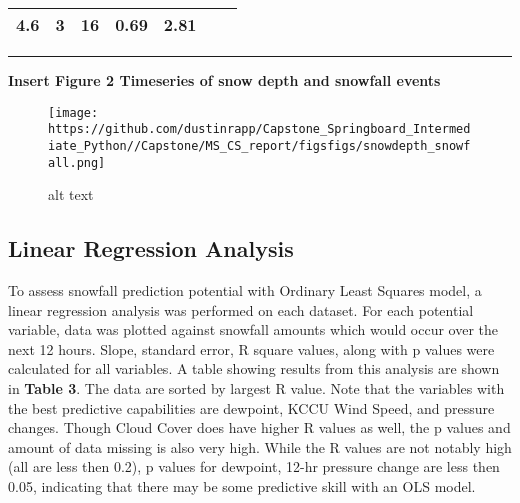 \documentclass[11pt]{article}
\makeatletter
\def\maxwidth{\ifdim\Gin@nat@width>\linewidth\linewidth
    \else\Gin@nat@width\fi}
\let\Oldincludegraphics\includegraphics
\renewcommand{\includegraphics}[1]{\Oldincludegraphics[width=.8\maxwidth]{#1}}
\makeatother
\begin{document}
\begin{longtable}[]{@{}lllllll@{}}
\begin{minipage}[t]{0.06\columnwidth}
4.6\strut
\end{minipage} & \begin{minipage}[t]{0.08\columnwidth}\raggedright\strut
3\strut
\end{minipage} & \begin{minipage}[t]{0.06\columnwidth}\raggedright\strut
16\strut
\end{minipage} & \begin{minipage}[t]{0.16\columnwidth}\raggedright\strut
0.69\strut
\end{minipage} & \begin{minipage}[t]{0.13\columnwidth}\raggedright\strut
2.81\strut
\end{minipage}\tabularnewline
\bottomrule
\end{longtable}

\begin{center}\rule{0.5\linewidth}{\linethickness}\end{center}

\textbf{Insert Figure 2 Timeseries of snow depth and snowfall events}

\begin{figure}
\centering
\texttt{[image: https://github.com/dustinrapp/Capstone\_Springboard\_Intermediate\_Python//Capstone/MS\_CS\_report/figsfigs/snowdepth\_snowfall.png]}
\caption{alt text}
\end{figure}

\subsection{Linear Regression
Analysis}\label{linear-regression-analysis}

To assess snowfall prediction potential with Ordinary Least Squares
model, a linear regression analysis was performed on each dataset. For
each potential variable, data was plotted against snowfall amounts which
would occur over the next 12 hours. Slope, standard error, R square
values, along with p values were calculated for all variables. A table
showing results from this analysis are shown in \textbf{Table 3}. The
data are sorted by largest R value. Note that the variables with the
best predictive capabilities are dewpoint, KCCU Wind Speed, and pressure
changes. Though Cloud Cover does have higher R values as well, the p
values and amount of data missing is also very high. While the R values
are not notably high (all are less then 0.2), p values for dewpoint,
12-hr pressure change are less then 0.05, indicating that there may be
some predictive skill with an OLS model.
\end{document}
